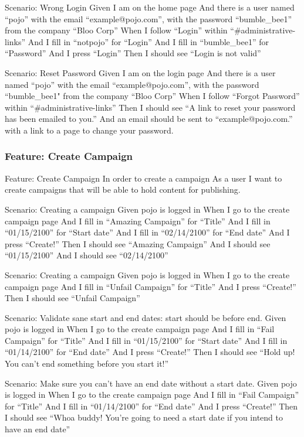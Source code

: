 \documentclass[12pt]{article}
\begin{document}
\begin{hangparas}{0.25in}{1}
Scenario: Wrong Login 
  Given I am on the home page 
  And there is a user named ``pojo'' with the email ``example@pojo.com'', with the password ``bumble\_bee1'' from the company ``Bloo Corp'' 
  When I follow ``Login'' within ``\#administrative-links'' 
  And I fill in ``notpojo'' for ``Login'' 
  And I fill in ``bumble\_bee1'' for ``Password'' 
  And I press ``Login'' 
  Then I should see ``Login is not valid'' 

Scenario: Reset Password 
  Given I am on the login page 
  And there is a user named ``pojo'' with the email ``example@pojo.com'', with the password ``bumble\_bee1" from the company ``Bloo Corp'' 
  When I follow ``Forgot Password'' within ``\#administrative-links'' 
  Then I should see ``A link to reset your password has been emailed to you.'' 
  And an email should be sent to ``example@pojo.com.'' with a link to a page to change your password. 
\end{hangparas}

\subsubsection{Feature: Create Campaign}

\begin{hangparas}{0.25in}{1}
Feature: Create Campaign 
In order to create a campaign 
As a user 
I want to create campaigns that will be able to hold content for publishing. 

Scenario: Creating a campaign 
Given pojo is logged in 
When I go to the create campaign page 
And I fill in ``Amazing Campaign'' for ``Title'' 
And I fill in ``01/15/2100'' for ``Start date'' 
And I fill in ``02/14/2100'' for ``End date''   
And I press ``Create!'' 
Then I should see ``Amazing Campaign'' 
And I should see ``01/15/2100'' 
And I should see ``02/14/2100'' 

Scenario: Creating a campaign 
Given pojo is logged in 
When I go to the create campaign page 
And I fill in ``Unfail Campaign'' for ``Title'' 
And I press ``Create!'' 
Then I should see ``Unfail Campaign'' 

Scenario: Validate sane start and end dates: start should be before end. 
Given pojo is logged in 
When I go to the create campaign page 
And I fill in ``Fail Campaign'' for ``Title'' 
And I fill in ``01/15/2100'' for ``Start date'' 
And I fill in ``01/14/2100'' for ``End date'' 
And I press ``Create!'' 
Then I should see ``Hold up! You can't end something before you start it!'' 

Scenario: Make sure you can't have an end date without a start date. 
Given pojo is logged in 
When I go to the create campaign page 
And I fill in ``Fail Campaign'' for ``Title'' 
And I fill in ``01/14/2100'' for ``End date'' 
And I press ``Create!'' 
Then I should see ``Whoa buddy! You're going to need a start date if you intend to have an end date'' 
\end{hangparas}
\end{document}
